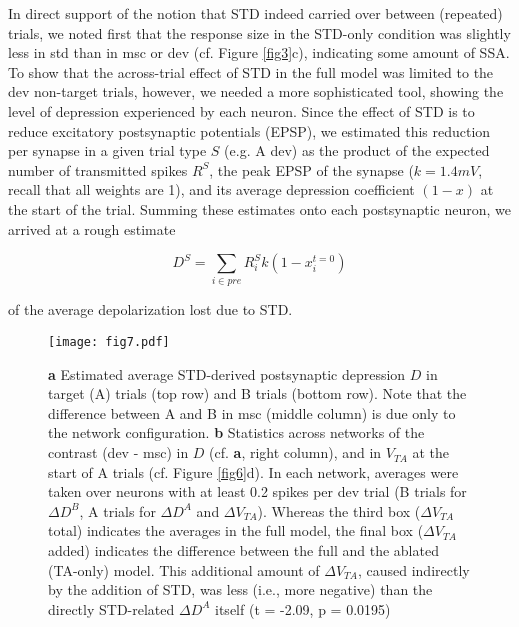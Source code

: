 \documentclass[pdflatex,referee,iicol,sn-basic]{sn-jnl}
\theoremstyle{thmstyleone}%
\theoremstyle{thmstyletwo}%
\theoremstyle{thmstylethree}%
\begin{document}
In direct support of the notion that STD indeed carried over between (repeated) trials, we noted first that the response size in the STD-only condition was slightly less in std than in msc or dev (cf. Figure \ref{fig3}c), indicating some amount of SSA. To show that the across-trial effect of STD in the full model was limited to the dev non-target trials, however, we needed a more sophisticated tool, showing the level of depression experienced by each neuron. Since the effect of STD is to reduce excitatory postsynaptic potentials (EPSP), we estimated this reduction per synapse in a given trial type $S$ (e.g. A dev) as the product of the expected number of transmitted spikes $R^S$, the peak EPSP of the synapse ($k = 1.4 mV$, recall that all weights are 1), and its average depression coefficient $(1-x)$ at the start of the trial. Summing these estimates onto each postsynaptic neuron, we arrived at a rough estimate

\begin{equation}
    D^S = \sum_{i \in pre} R^S_i k (1-x_i^{t=0})
\end{equation}

of the average depolarization lost due to STD.

\begin{figure*}%
    \centering
    \texttt{[image: fig7.pdf]}
    \caption{\textbf{a} Estimated average STD-derived postsynaptic depression $D$ in target (A) trials (top row) and B trials (bottom row). Note that the difference between A and B in msc (middle column) is due only to the network configuration. \textbf{b} Statistics across networks of the contrast (dev - msc) in $D$ (cf. \textbf{a}, right column), and in $V_{TA}$ at the start of A trials (cf. Figure \ref{fig6}d). In each network, averages were taken over neurons with at least 0.2 spikes per dev trial (B trials for $\Delta D^B$, A trials for $\Delta D^A$ and $\Delta V_{TA}$). Whereas the third box ($\Delta V_{TA}$ total) indicates the averages in the full model, the final box ($\Delta V_{TA}$ added) indicates the difference between the full and the ablated (TA-only) model. This additional amount of $\Delta V_{TA}$, caused indirectly by the addition of STD, was less (i.e., more negative) than the directly STD-related $\Delta D^A$ itself (t = -2.09, p = 0.0195)}
    \label{fig7}
\end{figure*}
\end{document}
